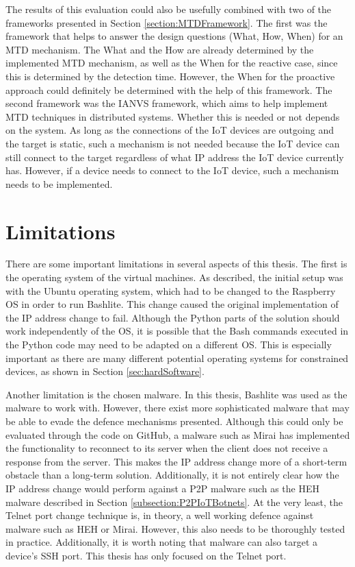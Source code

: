 The results of this evaluation could also be usefully combined with two of the frameworks presented in Section \ref{section:MTDFramework}. The first was the framework that helps to answer the design questions (What, How, When) for an MTD mechanism. The What and the How are already determined by the implemented MTD mechanism, as well as the When for the reactive case, since this is determined by the detection time. However, the When for the proactive approach could definitely be determined with the help of this framework. The second framework was the IANVS framework, which aims to help implement MTD techniques in distributed systems. Whether this is needed or not depends on the system. As long as the connections of the IoT devices are outgoing and the target is static, such a mechanism is not needed because the IoT device can still connect to the target regardless of what IP address the IoT device currently has. However, if a device needs to connect to the IoT device, such a mechanism needs to be implemented. 




\section{Limitations} \label{section:limitations}
There are some important limitations in several aspects of this thesis. The first is the operating system of the virtual machines. As described, the initial setup was with the Ubuntu operating system, which had to be changed to the Raspberry OS in order to run Bashlite. This change caused the original implementation of the IP address change to fail. Although the Python parts of the solution should work independently of the OS, it is possible that the Bash commands executed in the Python code may need to be adapted on a different OS. This is especially important as there are many different potential operating systems for constrained devices, as shown in Section \ref{sec:hardSoftware}.

Another limitation is the chosen malware. In this thesis, Bashlite was used as the malware to work with. However, there exist more sophisticated malware that may be able to evade the defence mechanisms presented. Although this could only be evaluated through the code on GitHub, a malware such as Mirai has implemented the functionality to reconnect to its server when the client does not receive a response from the server. This makes the IP address change more of a short-term obstacle than a long-term solution. Additionally, it is not entirely clear how the IP address change would perform against a P2P malware such as the HEH malware described in Section \ref{subsection:P2PIoTBotnets}. At the very least, the Telnet port change technique is, in theory, a well working defence against malware such as HEH or Mirai. However, this also needs to be thoroughly tested in practice. Additionally, it is worth noting that malware can also target a device's SSH port. This thesis has only focused on the Telnet port.    

